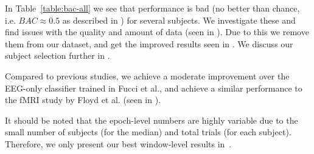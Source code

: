         

        In Table~\ref{table:bac-all} we see that performance is bad (no better than chance, i.e. $BAC \approx 0.5$ as described in ) for several subjects. We investigate these and find issues with the quality and amount of data (seen in ). Due to this we remove them from our dataset, and get the improved results seen in . We discuss our subject selection further in .

        Compared to previous studies, we achieve a moderate improvement over the EEG-only classifier trained in Fucci et al., and achieve a similar performance to the fMRI study by Floyd et al. (seen in ).

        

        It should be noted that the epoch-level numbers are highly variable due to the small number of subjects (for the median) and total trials (for each subject). Therefore, we only present our best window-level results in~.

        

